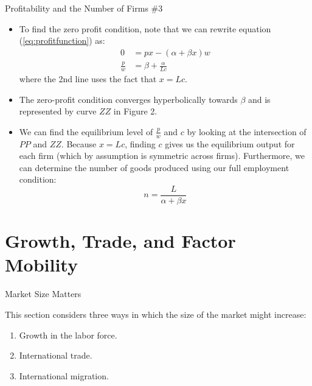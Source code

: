 \documentclass[aspectratio=169]{beamer}
\begin{document}
\begin{frame}{Profitability and the Number of Firms \#3}

\begin{itemize}
    \item<1-> To find the zero profit condition, note that we can rewrite equation (\ref{eq:profitfunction}) as:
    \begin{equation}
        \begin{split}
            0 &= px - \left( \alpha + \beta x \right) w \\
            \frac{p}{w} &= \beta + \frac{\alpha}{Lc}
        \end{split}
        \label{eq:zeroprofitcondition}
    \end{equation}
    where the 2nd line uses the fact that $ x = Lc$.
    \item<2-> The zero-profit condition converges hyperbolically towards $ \beta $ and is represented by curve $ ZZ $ in Figure 2.
    \item<3-> We can find the equilibrium level of  $ \frac{p}{w} $ and $ c $ by looking at the intersection of $ PP $ and $ ZZ $.  Because $ x = Lc $, finding $ c $ gives us the equilibrium output for each firm (which by assumption is symmetric across firms).  Furthermore, we can determine the number of goods produced using our full employment condition:
    \begin{equation}
        n = \frac{L}{\alpha + \beta x}
        \label{eq:numberofgoods}
    \end{equation}
\end{itemize}
    
\end{frame}


\section{Growth, Trade, and Factor Mobility}


\begin{frame}{Market Size Matters}

This section considers three ways in which the size of the market might increase:
\begin{enumerate}
    \item Growth in the labor force.
    \item International trade.
    \item International migration.
\end{enumerate}
    
\end{frame}
\end{document}
